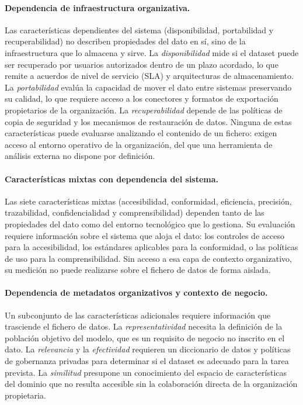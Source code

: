 \paragraph{Dependencia de infraestructura organizativa.}
Las características dependientes del sistema (disponibilidad, portabilidad
y recuperabilidad) no describen propiedades del dato en sí, sino de la
infraestructura que lo almacena y sirve.  La \emph{disponibilidad} mide si
el dataset puede ser recuperado por usuarios autorizados dentro de un
plazo acordado, lo que remite a acuerdos de nivel de servicio (\ac{SLA})
y arquitecturas de almacenamiento.  La \emph{portabilidad} evalúa la
capacidad de mover el dato entre sistemas preservando su calidad, lo que
requiere acceso a los conectores y formatos de exportación propietarios de
la organización.  La \emph{recuperabilidad} depende de las políticas de
copia de seguridad y los mecanismos de restauración de datos.  Ninguna de
estas características puede evaluarse analizando el contenido de un
fichero: exigen acceso al entorno operativo de la organización, del que
una herramienta de análisis externa no dispone por definición.

\paragraph{Características mixtas con dependencia del sistema.}
Las siete características mixtas (accesibilidad, conformidad, eficiencia,
precisión, trazabilidad, confidencialidad y comprensibilidad) dependen
tanto de las propiedades del dato como del entorno tecnológico que lo
gestiona.  Su evaluación requiere información sobre el sistema que aloja
el dato: los controles de acceso para la accesibilidad, los estándares
aplicables para la conformidad, o las políticas de uso para la
comprensibilidad.  Sin acceso a esa capa de contexto organizativo, su
medición no puede realizarse sobre el fichero de datos de forma aislada.

\paragraph{Dependencia de metadatos organizativos y contexto de negocio.}
Un subconjunto de las características adicionales requiere información que
trasciende el fichero de datos.  La \emph{representatividad} necesita la
definición de la población objetivo del modelo, que es un requisito de
negocio no inscrito en el dato.  La \emph{relevancia} y la
\emph{efectividad} requieren un diccionario de datos y políticas de
gobernanza privadas para determinar si el dataset es adecuado para la
tarea prevista.  La \emph{similitud} presupone un conocimiento del espacio
de características del dominio que no resulta accesible sin la
colaboración directa de la organización propietaria.

